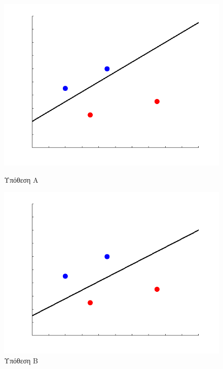 \documentclass{article}
\begin{document}
  \begin{figure}[H]
    \centering
    \begin{minipage}{.333\textwidth}
        \centering
        \includegraphics[width=\linewidth, height=0.15\textheight]{svm_line1.png}
        \caption[Υπόθεση Α μηχανής διανυσματικής στήριξης]{Υπόθεση Α}
        
    \end{minipage}%
    \begin{minipage}{0.333\textwidth}
        \centering
        \includegraphics[width=\linewidth, height=0.15\textheight]{svm_line2.png}
        \caption[Υπόθεση Β μηχανής διανυσματικής στήριξης]{Υπόθεση Β}
       

\end{minipage}
\end{figure}
\end{document}
